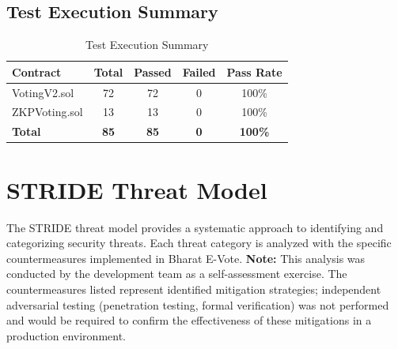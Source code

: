 \documentclass[oneside,a4paper,12pt]{book}
\begin{document}
\subsection{Test Execution Summary}
\begin{table}[htbp]
\centering
\renewcommand{\arraystretch}{1.3}
\small
\begin{tabularx}{\textwidth}{|X|c|c|c|c|}
\hline
\textbf{Contract} & \textbf{Total} & \textbf{Passed} & \textbf{Failed} & \textbf{Pass Rate} \\
\hline
VotingV2.sol & 72 & 72 & 0 & 100\% \\
\hline
ZKPVoting.sol & 13 & 13 & 0 & 100\% \\
\hline
\textbf{Total} & \textbf{85} & \textbf{85} & \textbf{0} & \textbf{100\%} \\
\hline
\end{tabularx}
\caption{Test Execution Summary}
\label{tab:test_summary}
\end{table}

\section{STRIDE Threat Model}

The STRIDE threat model provides a systematic approach to identifying and categorizing security threats. Each threat category is analyzed with the specific countermeasures implemented in Bharat E-Vote. \textbf{Note:} This analysis was conducted by the development team as a self-assessment exercise. The countermeasures listed represent identified mitigation strategies; independent adversarial testing (penetration testing, formal verification) was not performed and would be required to confirm the effectiveness of these mitigations in a production environment.
\end{document}

